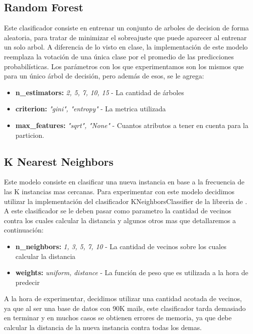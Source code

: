 \subsection{Random Forest}
Este clasificador consiste en entrenar un conjunto de arboles de decision de forma aleatoria, para tratar de minimizar el sobreajuste que puede aparecer al entrenar un solo arbol.
A diferencia de lo visto en clase, la implementación de este modelo reemplaza la votación de una única clase por el promedio de las predicciones probabilísticas.
 Los parámetros con los que experimentamos son los mismos que para un único árbol de decisión, pero además de esos, se le agrega:
\begin{itemize}
\item \textbf{n\_estimators:} \textit{2, 5, 7, 10, 15} - La cantidad de árboles
\item \textbf{criterion:} \textit{"gini", "entropy"} - La metrica utilizada
\item \textbf{max\_features:} \textit{"sqrt", "None"} - Cuantos atributos a tener en cuenta para la particion.
\end{itemize}

\subsection{K Nearest Neighbors}
Este modelo consiste en clasificar una nueva instancia en base a la frecuencia de las K instancias mas cercanas.
Para experimentar con este modelo decidimos utilizar la implementación del clasificador KNeighborsClassifier de la libreria de .
A este clasificador se le deben pasar como parametro la cantidad de vecinos contra los cuales calcular la distancia y algunos otros mas que detallaremos a continuación:
\begin{itemize}
\item \textbf{n\_neighbors:} \textit{1, 3, 5, 7, 10} - La cantidad de vecinos sobre los cuales calcular la distancia
\item \textbf{weights:} \textit{uniform, distance} - La función de peso que es utilizada a la hora de predecir
\end{itemize}
A la hora de experimentar, decidimos utilizar una cantidad acotada de vecinos, ya que al ser una base de datos con 90K mails, este clasificador tarda demasiado
en terminar y en muchos casos se obtienen errores de memoria, ya que debe calcular la distancia de la nueva instancia contra todas los demas.



